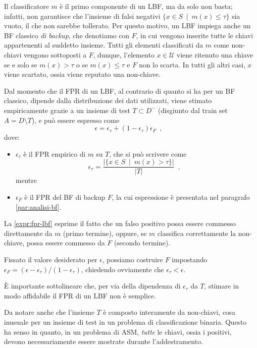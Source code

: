 Il classificatore $m$ è il primo componente di un LBF, ma da solo non basta; infatti, non garantisce che l'insieme di falsi negativi $\{x \in S \enspace | \enspace m(x) \leq \tau \}$ sia vuoto, il che non sarebbe tollerato. Per questo motivo, un LBF impiega anche un BF classico \textit{di backup}, che denotiamo con $F$, in cui vengono inserite tutte le chiavi appartenenti al suddetto insieme. Tutti gli elementi classificati da $m$ come non-chiavi vengono sottoposti a $F$, dunque, l'elemento $x \in \mathcal{U}$ viene ritenuto una chiave se e solo se $m(x) > \tau$ o se $m(x) \leq \tau$ e $F$ non lo scarta. In tutti gli altri casi, $x$ viene scartato, ossia viene reputato una non-chiave.

Dal momento che il FPR di un LBF, al contrario di quanto si ha per un BF classico, dipende dalla distribuzione dei dati utilizzati, viene stimato empiricamente grazie a un insieme di test $T \subset D^-$ (disgiunto dal train set $A = D \setminus T$), e può essere espresso come
\begin{equation}
    \epsilon = \epsilon_{\tau} + (1-\epsilon_{\tau}) \epsilon_F \enspace ,
    \label{expr:fpr-lbf}
\end{equation}
dove:
\begin{itemize}
    \item $\epsilon_{\tau}$ è il FPR empirico di $m$ su $T$, che si può scrivere come
    \begin{equation}
        \epsilon_{\tau} = \frac{|\{ x \in S \enspace | \enspace m(x) > \tau \}|}{|T|} \enspace,
    \end{equation}
    mentre
    \item $\epsilon_F$ è il FPR del BF di backup $F$, la cui espressione è presentata nel paragrafo \ref{par:analisi-bf}.
\end{itemize}
La \ref{expr:fpr-lbf} esprime il fatto che un falso positivo possa essere commesso direttamente da $m$ (primo termine), oppure, se $m$ classifica correttamente la non-chiave, possa essere commesso da $F$ (secondo termine).

Fissato il valore desiderato per $\epsilon$, possiamo costruire $F$ impostando $\epsilon_F = (\epsilon - \epsilon_{\tau}) / (1- \epsilon_{\tau})$, chiedendo ovviamente che $\epsilon_{\tau} < \epsilon$.

È importante sottolineare che, per via della dipendenza di $\epsilon_{\tau}$ da $T$, stimare in modo affidabile il FPR di un LBF non è semplice.

Da notare anche che l'insieme $T$ è composto interamente da non-chiavi, cosa inusuale per un insieme di test in un problema di classificazione binaria. Questo ha senso in quanto, in un problema di ASM, \textit{tutte} le chiavi, ossia i positivi, devono necessariamente essere mostrate durante l'addestramento.

